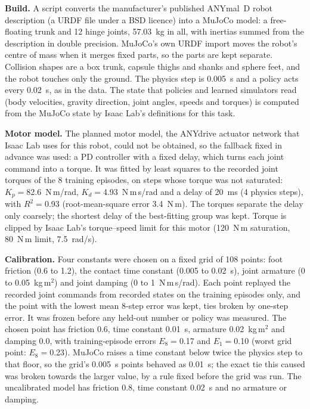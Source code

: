 \textbf{Build.} A script converts the manufacturer's published ANYmal~D robot description (a URDF file under a BSD
licence) into a MuJoCo model: a free-floating trunk and 12 hinge joints, 57.03~kg in all, with inertias summed
from the description in double precision. MuJoCo's own URDF import moves the robot's centre of mass when it merges
fixed parts, so the parts are kept separate. Collision shapes are a box trunk, capsule thighs and shanks and sphere
feet, and the robot touches only the ground. The physics step is 0.005~s and a policy acts every 0.02~s, as in the
data. The state that policies and learned simulators read (body velocities, gravity direction, joint angles, speeds
and torques) is computed from the MuJoCo state by Isaac Lab's definitions for this task.

\textbf{Motor model.} The planned motor model, the ANYdrive actuator network that Isaac Lab uses for this robot, could
not be obtained, so the fallback fixed in advance was used: a PD controller with a fixed delay, which turns each
joint command into a torque. It was fitted by least squares to the recorded joint torques of the 8
training episodes, on steps whose torque was not saturated: $K_p={}$82.6~N\,m/rad, $K_d={}$4.93~N\,m\,s/rad
and a delay of 20~ms (4 physics steps), with $R^2={}$0.93 (root-mean-square
error 3.4~N\,m). The torques separate the delay only coarsely; the shortest delay of the best-fitting group
was kept. Torque is clipped by Isaac Lab's torque--speed limit for this motor (120~N\,m saturation,
80~N\,m limit, 7.5~rad/s).

\textbf{Calibration.} Four constants were chosen on a fixed grid of 108 points: foot friction (0.6 to 1.2),
the contact time constant (0.005 to 0.02~s), joint armature (0 to 0.05~kg\,m$^2$) and joint damping (0 to
1~N\,m\,s/rad). Each point replayed the recorded joint commands from recorded states on the training episodes only,
and the point with the lowest mean 8-step error was kept, ties broken by one-step error. It was frozen before any
held-out number or policy was measured. The chosen point has friction 0.6, time constant
0.01~s, armature 0.02~kg\,m$^2$ and damping 0.0, with training-episode
errors $E_8={}$0.17 and $E_1={}$0.10 (worst grid point: $E_8={}$0.23). MuJoCo
raises a time constant below twice the physics step to that floor, so the grid's 0.005~s points behaved as 0.01~s;
the exact tie this caused was broken towards the larger value, by a rule fixed before the grid was run. The uncalibrated
model has friction 0.8, time constant 0.02~s and no armature or damping.

